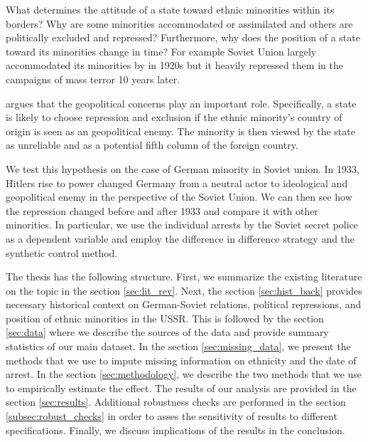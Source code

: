 What determines the attitude of a state toward ethnic minorities within
its borders? Why are some minorities accommodated or assimilated and
others are politically excluded and repressed? Furthermore,  why does the
position of a state toward its minorities change in time? For example
Soviet Union largely accommodated its minorities by in 1920s but it
heavily repressed them in the campaigns of  mass terror 10 years later. 

\citet{mylonas_politics_2013} argues that the geopolitical concerns play an important role. Specifically, a state is likely to choose repression and
exclusion if the ethnic minority's country of origin is seen as an
geopolitical enemy. The minority is then viewed by the state as
unreliable and as a potential fifth column of the foreign country.   

We test this hypothesis on the case of German minority in Soviet union.
In 1933, Hitlers rise to power changed Germany from a neutral actor to ideological and geopolitical enemy in the perspective of the Soviet Union. We can then see how the repression changed before and after 1933 and compare it with other minorities. In particular, we use the individual arrests by the Soviet secret police as a dependent variable and employ the difference in difference strategy and the synthetic control method. 

The thesis has the following structure. First, we summarize the existing literature on the topic in the section \ref{sec:lit_rev}. Next, the section \ref{sec:hist_back} provides necessary historical context on German-Soviet relations, political repressions, and position of ethnic minorities in the USSR. This is followed by the section \ref{sec:data} where we describe the sources of the data and provide summary statistics of our main dataset. 
In the section \ref{sec:missing_data}, we present the methods that we use to impute missing information on ethnicity and the date of arrest. In the section \ref{sec:methodology}, we  describe the two methods that we use to empirically estimate the effect. 
The results of our analysis  are provided in the section \ref{sec:results}. Additional robustness checks are performed in the section \ref{subsec:robust_checks} in order to asses the sensitivity of results to different specifications. Finally, we discuss implications of the results in the conclusion. 


